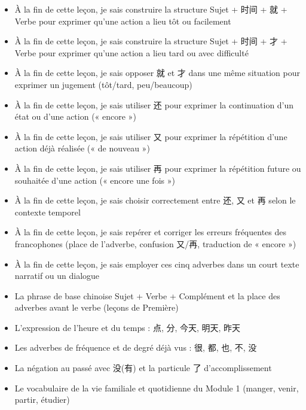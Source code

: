 \documentclass[11pt]{article}
\begin{document}
\begin{objectifs}
\begin{itemize}
\item À la fin de cette leçon, je sais construire la structure Sujet + 时间 + 就 + Verbe pour exprimer qu'une action a lieu tôt ou facilement
\item À la fin de cette leçon, je sais construire la structure Sujet + 时间 + 才 + Verbe pour exprimer qu'une action a lieu tard ou avec difficulté
\item À la fin de cette leçon, je sais opposer 就 et 才 dans une même situation pour exprimer un jugement (tôt/tard, peu/beaucoup)
\item À la fin de cette leçon, je sais utiliser 还 pour exprimer la continuation d'un état ou d'une action (« encore »)
\item À la fin de cette leçon, je sais utiliser 又 pour exprimer la répétition d'une action déjà réalisée (« de nouveau »)
\item À la fin de cette leçon, je sais utiliser 再 pour exprimer la répétition future ou souhaitée d'une action (« encore une fois »)
\item À la fin de cette leçon, je sais choisir correctement entre 还, 又 et 再 selon le contexte temporel
\item À la fin de cette leçon, je sais repérer et corriger les erreurs fréquentes des francophones (place de l'adverbe, confusion 又/再, traduction de « encore »)
\item À la fin de cette leçon, je sais employer ces cinq adverbes dans un court texte narratif ou un dialogue
\end{itemize}
\end{objectifs}

\begin{prerequis}
\begin{itemize}
\item La phrase de base chinoise Sujet + Verbe + Complément et la place des adverbes avant le verbe (leçons de Première)
\item L'expression de l'heure et du temps : 点, 分, 今天, 明天, 昨天
\item Les adverbes de fréquence et de degré déjà vus : 很, 都, 也, 不, 没
\item La négation au passé avec 没(有) et la particule 了 d'accomplissement
\item Le vocabulaire de la vie familiale et quotidienne du Module 1 (manger, venir, partir, étudier)
\end{itemize}
\end{prerequis}
\end{document}
